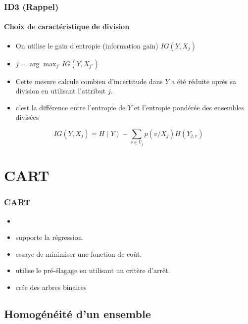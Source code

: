 \documentclass[xcolor=table]{beamer}
\begin{document}
\begin{frame}
	\frametitle{ID3 (Rappel)}
	\framesubtitle{Choix de caractéristique de division}
	
	\begin{itemize}
		\item On utilise le gain d'entropie (information gain) $IG(Y, X_j)$
		\item $j = \arg\max_{j'} IG(Y, X_{j'})$
		\item Cette mesure calcule combien d'incertitude dans $Y$ a été réduite après sa division en utilisant l'attribut $j$.
		\item c'est la différence entre l'entropie de $Y$ et l'entropie pondérée des ensembles divisées
	\end{itemize}

	\[IG(Y, X_j) = H(Y) - \sum_{v \in V_j} p(v/X_j) H(Y_{j, v})\]
	
	
\end{frame}

\section{CART}

\begin{frame}
	\frametitle{CART}
	
	\begin{itemize}
		\item {}
		\item supporte la régression.
		\item essaye de minimiser une fonction de coût.
		\item utilise le pré-élagage en utilisant un critère d'arrêt.
		\item crée des arbres binaires 
	\end{itemize}
	
\end{frame}

\subsection{Homogénéité d'un ensemble}
\end{document}
